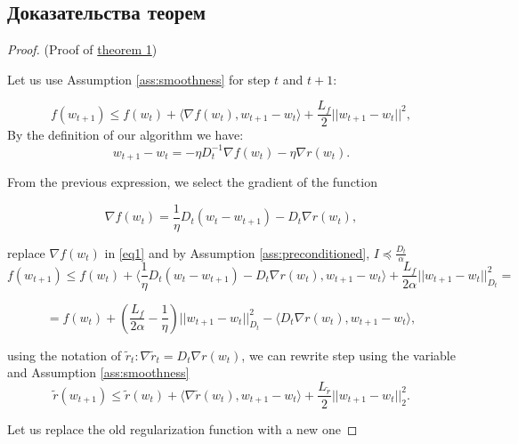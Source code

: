 \subsection{Доказательства теорем}
\label{appendix:theorems}

\begin{proof} (Proof of \hyperref[theor:1]{theorem 1})
\label{proof:theorem1}

Let us use Assumption \eqref{ass:smoothness} for step $t$ and $t+1$:

\begin{equation} \label{eq1}
    f(w_{t+1}) \leq f(w_t) + \langle \nabla f(w_t), w_{t+1} - w_t \rangle + \frac{L_f}{2}||w_{t+1} - w_t ||^2,
\end{equation}
By the definition of our algorithm we have:
\begin{equation*}
w_{t+1} - w_t = -\eta D_t^{-1} \nabla f(w_t) - \eta \nabla r(w_t).
\end{equation*}

From the previous expression, we select the gradient of the function

\begin{equation*}
\nabla f(w_t) = \frac{1}{\eta} D_t(w_t - w_{t+1}) - D_t \nabla r(w_t),
\end{equation*}

replace $\nabla f(w_t)$ in \ref{eq1} and by Assumption \ref{ass:preconditioned}, $I \preccurlyeq \frac{D_t}{\alpha}$
\begin{equation*}
    f(w_{t+1}) \leq f(w_t) + \langle \frac{1}{\eta}D_t(w_t - w_{t+1}) - D_t\nabla r(w_t), w_{t+1} - w_t \rangle + \frac{L_f}{2 \alpha} ||w_{t+1} - w_t||_{D_t}^2 = 
\end{equation*}

\begin{equation*}
    = f(w_t) + \left(\frac{L_f}{2 \alpha} - \frac{1}{\eta} \right) ||w_{t+1} - w_t||_{D_t}^2 - \langle D_t \nabla r(w_t), w_{t+1} - w_t \rangle,
\end{equation*}

using the notation of $\widetilde{r}_t : \nabla \widetilde{r}_t = D_t \nabla r(w_t)$,
we can rewrite step using the variable and Assumption \eqref{ass:smoothness}
\begin{equation*}
    \widetilde{r}(w_{t+1}) \leq \widetilde{r}(w_t) + \langle \nabla \widetilde{r}(w_t), w_{t+1} - w_t \rangle + \frac{L_{\tilde{r}}}{2} ||w_{t+1} - w_t||_2^2.
\end{equation*}

Let us replace the old regularization function with a new one


\end{proof}
